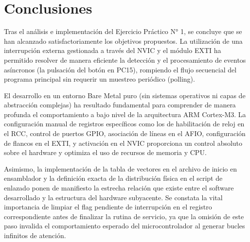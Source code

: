 \chapter{Conclusiones}
\label{ch:conclusiones}

Tras el análisis e implementación del Ejercicio Práctico N° 1, se concluye que se han alcanzado satisfactoriamente
los objetivos propuestos. La utilización de una interrupción externa gestionada a través del NVIC y el módulo EXTI
ha permitido resolver de manera eficiente la detección y el procesamiento de eventos asíncronos (la pulsación del
botón en PC15), rompiendo el flujo secuencial del programa principal sin requerir un muestreo periódico (polling).

El desarrollo en un entorno Bare Metal puro (sin sistemas operativos ni capas de abstracción complejas) ha resultado
fundamental para comprender de manera profunda el comportamiento a bajo nivel de la arquitectura ARM Cortex-M3. La
configuración manual de registros específicos como los de habilitación de reloj en el RCC, control de puertos GPIO,
asociación de líneas en el AFIO, configuración de flancos en el EXTI, y activación en el NVIC proporciona un control
absoluto sobre el hardware y optimiza el uso de recursos de memoria y CPU.

Asimismo, la implementación de la tabla de vectores en el archivo de inicio en ensamblador y la definición exacta de la
distribución física en el script de enlazado ponen de manifiesto la estrecha relación que existe entre el software
desarrollado y la estructura del hardware subyacente. Se constata la vital importancia de limpiar el flag pendiente
de interrupción en el registro correspondiente antes de finalizar la rutina de servicio, ya que la omisión de este
paso invalida el comportamiento esperado del microcontrolador al generar bucles infinitos de atención.

